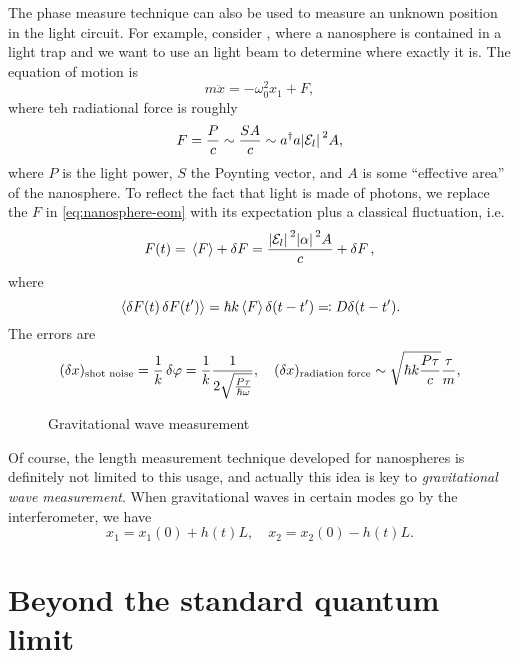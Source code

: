 \documentclass[hyperref, a4paper]{article}
\begin{document}
The phase measure technique can also be used to measure an unknown position in the light circuit.
For example, consider , where a nanosphere is contained in a light trap and we want to use an light beam to determine where exactly it is.
The equation of motion is 
\begin{equation}
    m \ddot{x} = - \omega_0^2 x_1 + F,
    \label{eq:nanosphere-eom}
\end{equation}
where teh radiational force is roughly
\begin{equation}
    F = \frac{P}{c} \sim \frac{SA}{c} \sim a^\dagger a \abs*{\mathcal{E}_l}^2 A,
\end{equation}
where $P$ is the light power, $S$ the Poynting vector, and $A$ is some ``effective area'' of the nanosphere.
To reflect the fact that light is made of photons, we replace the $F$ in \eqref{eq:nanosphere-eom} with its expectation plus a classical fluctuation, i.e.
\begin{equation}
    F(t) = \expval*{F} + \var{F} = \frac{\abs*{\mathcal{E}_l}^2 \abs*{\alpha}^2 A}{c} + \var{F},
\end{equation}
where 
\begin{equation}
    \expval*{\var{F(t)} \var{F(t')}} = \hbar k \expval*{F} \delta(t - t') \eqqcolon D \delta(t - t').
\end{equation}
The errors are
\begin{equation}
    (\var{x})_\text{shot noise} = \frac{1}{k} \var{\varphi} = \frac{1}{k} \frac{1}{2 \sqrt{\frac{P \tau}{\hbar \omega}}} , \quad (\var{x})_\text{radiation force} \sim \sqrt{\hbar k \frac{P \tau}{c}} \frac{\tau}{m}, 
\end{equation}

\begin{figure}
    \centering
    
    \caption{Gravitational wave measurement}
\end{figure}

Of course, the length measurement technique developed for nanospheres is definitely not limited to this usage, and actually this idea is key to \emph{gravitational wave measurement}.
When gravitational waves in certain modes go by the interferometer, we have 
\begin{equation}
    x_1 = x_1(0) + h(t) L, \quad x_2 = x_2(0) - h(t) L.
\end{equation}

\section{Beyond the standard quantum limit}
\end{document}
